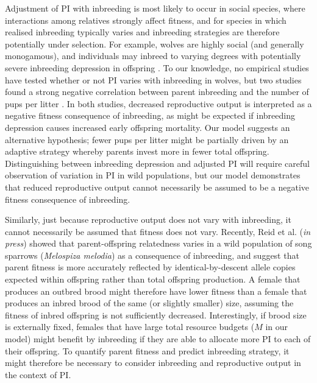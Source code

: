 \documentclass[12pt]{article}
\begin{document}
Adjustment of PI with inbreeding is most likely to occur in social species, where interactions among relatives strongly affect fitness, and for species in which realised inbreeding typically varies and inbreeding strategies are therefore potentially under selection. For example, wolves are highly social (and generally monogamous), and individuals may inbreed to varying degrees with potentially severe inbreeding depression in offspring \cite[][]{Raikkonen2009, Geffen2011}. To our knowledge, no empirical studies have tested whether or not PI varies with inbreeding in wolves, but two studies found a strong negative correlation between parent inbreeding and the number of pups per litter \cite[e.g.,][]{Liberg2005, Fredrickson2007}. In both studies, decreased reproductive output is interpreted as a negative fitness consequence of inbreeding, as might be expected if inbreeding depression causes increased early offspring mortality. Our model suggests an alternative hypothesis; fewer pups per litter might be partially driven by an adaptive strategy whereby parents invest more in fewer total offspring. Distinguishing between inbreeding depression and adjusted PI will require careful observation of variation in PI in wild populations, but our model demonstrates that reduced reproductive output cannot necessarily be assumed to be a negative fitness consequence of inbreeding.

Similarly, just because reproductive output does not vary with inbreeding, it cannot necessarily be assumed that fitness does not vary. Recently, Reid et al. (\textit{in press}) showed that parent-offspring relatedness varies in a wild population of song sparrows (\textit{Melospiza melodia}) as a consequence of inbreeding, and suggest that parent fitness is more accurately reflected by identical-by-descent allele copies expected within offspring rather than total offspring production. A female that produces an outbred brood might therefore have lower fitness than a female that produces an inbred brood of the same (or slightly smaller) size, assuming the fitness of inbred offspring is not sufficiently decreased. Interestingly, if brood size is externally fixed, females that have large total resource budgets ($M$ in our model) might benefit by inbreeding if they are able to allocate more PI to each of their offspring. To quantify parent fitness and predict inbreeding strategy, it might therefore be necessary to consider inbreeding and reproductive output in the context of PI.
\end{document}
